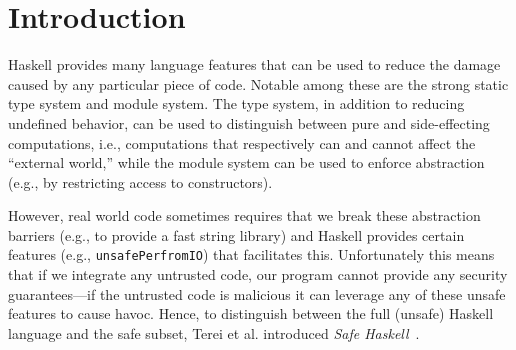 \section{Introduction}
\label{sec:intro}

Haskell provides many language features that can be used to reduce the
damage caused by any particular piece of code.
%
Notable among these are the strong static type system and module
system.
%
The type system, in addition to reducing undefined behavior, can be
used to distinguish between pure and side-effecting computations,
i.e., computations that respectively can and cannot affect the
``external world,'' while the module system can be used to enforce
abstraction (e.g., by restricting access to constructors).
%

However, real world code sometimes requires that we break these
abstraction barriers (e.g., to provide a fast string library) and
Haskell provides certain features (e.g., \verb|unsafePerfromIO|) that
facilitates this.
%
Unfortunately this means that if we integrate any untrusted code,
our program cannot provide any security guarantees---if the untrusted
code is malicious it can leverage any of these unsafe features to
cause havoc.
%
Hence, to distinguish between the full (unsafe) Haskell language and
the safe subset, Terei et al. introduced \emph{Safe
Haskell}~\cite{safehaskell}.
